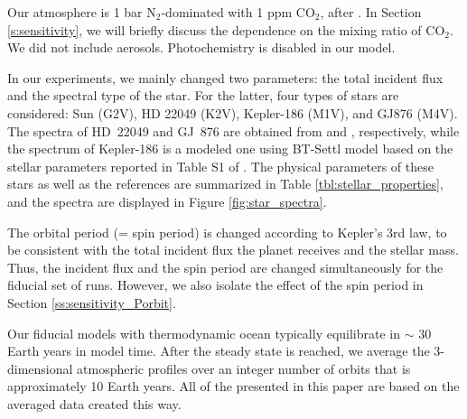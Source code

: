 \documentclass[11pt,numberedappendix,twocolappendix,]{emulateapj}
\begin{document}
Our atmosphere is 1 bar N$_2$-dominated with 1 ppm CO$_2$, after  \citet{Kopparapu2016}. 
In Section \ref{s:sensitivity}, we will briefly discuss the dependence on the mixing ratio of CO$_2$. 
We did not include aerosols. 
Photochemistry is disabled in our model. 


In our experiments, we mainly changed two parameters: the total incident flux  and the spectral type of the star. 
For the latter, four types of stars are considered: 
Sun (G2V), 
HD 22049 (K2V), 
Kepler-186 (M1V), and 
GJ876 (M4V). 
The spectra of HD~22049 and GJ~876 are obtained from \citet{Segura2003} and \citet{Domagal-Goldman2014}, respectively, 
while the spectrum of Kepler-186 is a modeled one using BT-Settl model \citep{Allard2012} based on the stellar parameters reported in Table S1 of \citet{Quintana2014}. 
The physical parameters of these stars as well as the references are summarized in Table \ref{tbl:stellar_properties}, and the spectra are displayed in Figure \ref{fig:star_spectra}. 

The orbital period (= spin period) is changed according to Kepler's 3rd law, to be consistent with the total incident flux the planet receives and the stellar mass. Thus, the incident flux and the spin period are changed simultaneously for the fiducial set of runs. 
However, we also isolate the effect of the spin period in Section \ref{ss:sensitivity_Porbit}. 

Our fiducial models with thermodynamic ocean typically equilibrate in  $\sim $ 30 Earth years in model time. 
After the steady state is reached, we average the 3-dimensional atmospheric profiles over an integer number of orbits that is approximately 10 Earth years. 
All of the presented in this paper are based on the averaged data created this way. 
\end{document}
